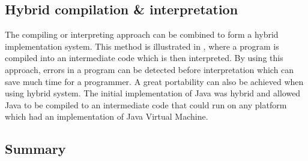 

\subsection{Hybrid compilation \& interpretation}

The compiling or interpreting approach can be combined to form a hybrid implementation system. This method is illustrated in , where a program is compiled into an intermediate code which is then interpreted. By using this approach, errors in a program can be detected before interpretation which can save much time for a programmer. A great portability can also be achieved when using hybrid system. The initial implementation of Java was hybrid and allowed Java to be compiled to an intermediate code that could run on any platform which had an implementation of Java Virtual Machine\cite[p. 50]{sebesta2013}. 



\subsection{Summary}
